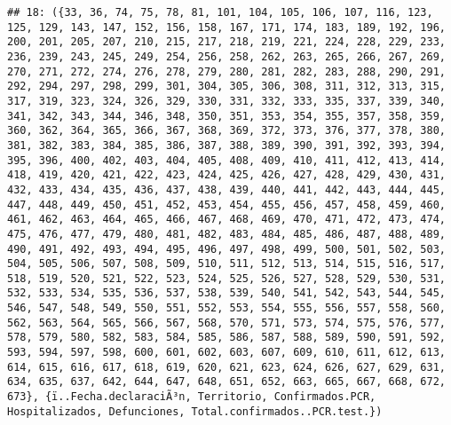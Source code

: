 \documentclass[
]{book}
\begin{document}
\begin{verbatim}
## 18: ({33, 36, 74, 75, 78, 81, 101, 104, 105, 106, 107, 116, 123, 125, 129, 143, 147, 152, 156, 158, 167, 171, 174, 183, 189, 192, 196, 200, 201, 205, 207, 210, 215, 217, 218, 219, 221, 224, 228, 229, 233, 236, 239, 243, 245, 249, 254, 256, 258, 262, 263, 265, 266, 267, 269, 270, 271, 272, 274, 276, 278, 279, 280, 281, 282, 283, 288, 290, 291, 292, 294, 297, 298, 299, 301, 304, 305, 306, 308, 311, 312, 313, 315, 317, 319, 323, 324, 326, 329, 330, 331, 332, 333, 335, 337, 339, 340, 341, 342, 343, 344, 346, 348, 350, 351, 353, 354, 355, 357, 358, 359, 360, 362, 364, 365, 366, 367, 368, 369, 372, 373, 376, 377, 378, 380, 381, 382, 383, 384, 385, 386, 387, 388, 389, 390, 391, 392, 393, 394, 395, 396, 400, 402, 403, 404, 405, 408, 409, 410, 411, 412, 413, 414, 418, 419, 420, 421, 422, 423, 424, 425, 426, 427, 428, 429, 430, 431, 432, 433, 434, 435, 436, 437, 438, 439, 440, 441, 442, 443, 444, 445, 447, 448, 449, 450, 451, 452, 453, 454, 455, 456, 457, 458, 459, 460, 461, 462, 463, 464, 465, 466, 467, 468, 469, 470, 471, 472, 473, 474, 475, 476, 477, 479, 480, 481, 482, 483, 484, 485, 486, 487, 488, 489, 490, 491, 492, 493, 494, 495, 496, 497, 498, 499, 500, 501, 502, 503, 504, 505, 506, 507, 508, 509, 510, 511, 512, 513, 514, 515, 516, 517, 518, 519, 520, 521, 522, 523, 524, 525, 526, 527, 528, 529, 530, 531, 532, 533, 534, 535, 536, 537, 538, 539, 540, 541, 542, 543, 544, 545, 546, 547, 548, 549, 550, 551, 552, 553, 554, 555, 556, 557, 558, 560, 562, 563, 564, 565, 566, 567, 568, 570, 571, 573, 574, 575, 576, 577, 578, 579, 580, 582, 583, 584, 585, 586, 587, 588, 589, 590, 591, 592, 593, 594, 597, 598, 600, 601, 602, 603, 607, 609, 610, 611, 612, 613, 614, 615, 616, 617, 618, 619, 620, 621, 623, 624, 626, 627, 629, 631, 634, 635, 637, 642, 644, 647, 648, 651, 652, 663, 665, 667, 668, 672, 673}, {ï..Fecha.declaraciÃ³n, Territorio, Confirmados.PCR, Hospitalizados, Defunciones, Total.confirmados..PCR.test.})

\end{verbatim}
\end{document}
